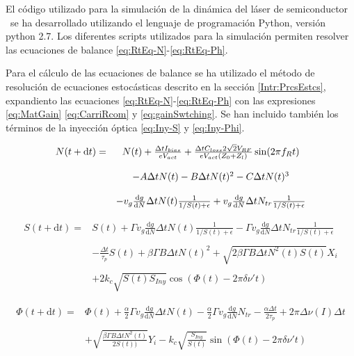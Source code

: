 El c\'odigo utilizado para la simulaci\'on de la din\'amica del l\'aser de semiconductor \gs\ se ha desarrollado utilizando el lenguaje de programaci\'on Python, versi\'on python 2.7. Los diferentes scripts utilizados para la simulaci\'on \cite{github} permiten resolver las ecuaciones de balance \ref{eq:RtEq-N}-\ref{eq:RtEq-Ph}.

Para el c\'alculo de las ecuaciones de balance se ha utilizado el m\'etodo de resoluci\'on de ecuaciones estoc\'asticas descrito en la secci\'on \ref{Intr:PrcsEstcs}, expandiento las ecuaciones \ref{eq:RtEq-N}-\ref{eq:RtEq-Ph} con las expresiones  \ref{eq:MatGain} \ref{eq:CarriRcom} y \ref{eq:gainSwtching}. Se han incluido tambi\'en los t\'erminos de la inyecci\'on \'optica \ref{eq:Iny-S} y \ref{eq:Iny-Phi}.

	\begin{equation}
		\begin{matrix}
			N(t + \mathrm{d}t) =  & N(t) + \frac{\Delta t I_{bias} }{e V_{act}} + \frac{\Delta t C_{loss} 2 \sqrt{2} V_{RF}}{eV_{act} (Z_0+Z_l)} \sin(2\pi f_R t) \\ \\
			 & - A\Delta t N(t) - B\Delta t N(t)^2 - C\Delta t N(t)^3 \\ \\
			 & - v_g \frac{\mathrm{d}g}{\mathrm{d}N} \Delta t N(t) \frac{1}{1/S(t) + \epsilon}  + v_g \frac{\mathrm{d}g}{\mathrm{d}N} \Delta t N_{tr} \frac{1}{1/S(t) + \epsilon}
		\end{matrix}
		\label{eq:Code-N}
	\end{equation}

	\begin{equation}
		\begin{matrix}
			S(t + \mathrm{d}t) =  & S(t) + \Gamma v_g \frac{\mathrm{d}g}{\mathrm{d}N} \Delta t N(t) \frac{1}{1/S(t) + \epsilon} - \Gamma v_g \frac{\mathrm{d}g}{\mathrm{d}N} \Delta t N_{tr} \frac{1}{1/S(t) + \epsilon} \\ \\
			 & - \frac{\Delta t}{\tau_p}S(t) + \beta\Gamma B\Delta t N(t)^2 + \sqrt{2 \beta \Gamma B \Delta tN^2(t)S(t)} X_i \\ \\
			 & + 2k_c\sqrt{S(t)S_{Iny}} \cos(\Phi(t) - 2\pi \delta\nu't)
		\end{matrix}
		\label{eq:Code-S}
	\end{equation}

	\begin{equation}
		\begin{matrix}
			\Phi(t + \mathrm{d}t) =  & \Phi(t) + \frac{\alpha}{2}\Gamma v_g \frac{\mathrm{d}g}{\mathrm{d}N} \Delta t N(t) - \frac{\alpha}{2}\Gamma v_g \frac{\mathrm{d} g}{\mathrm{d}N} N_{tr} - \frac{\alpha\Delta t}{2\tau_p} + 2\pi\Delta\nu(I)\Delta t \\ \\
			 & + \sqrt{\frac{\beta \Gamma B \Delta t N^2(t)}{2 S(t))}} Y_i - k_c\sqrt{\frac{S_{Iny}}{S(t)}} \sin(\Phi(t) - 2\pi \delta\nu't)
		\end{matrix}
		\label{eq:Code-Ph}
	\end{equation}

